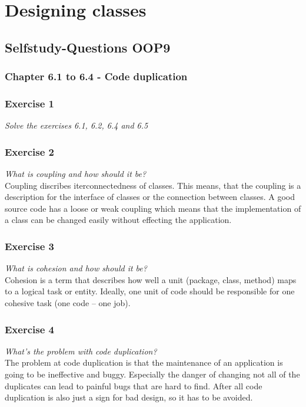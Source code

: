 \section{Designing classes}


\subsection{Selfstudy-Questions OOP9}

\subsubsection{Chapter 6.1 to 6.4 - Code duplication}

\subsubsection*{Exercise 1}
\textit{Solve the exercises 6.1, 6.2, 6.4 and 6.5} \\

\subsubsection*{Exercise 2}
\textit{What is coupling and how should it be?} \\
Coupling discribes iterconnectedness of classes. This means, that the 
coupling is a description for the interface of classes or the connection
between classes. A good source code has a loose or weak coupling which means
that the implementation of a class can be changed easily without effecting
the application.

\subsubsection*{Exercise 3}
\textit{What is cohesion and how should it be?} \\
Cohesion is a term that describes how well a unit (package, class, method) 
maps to a logical task or entity. Ideally, one unit of code should be 
responsible for one cohesive task (one code -- one job).

\subsubsection*{Exercise 4}
\textit{What's the problem with code duplication?} \\
The problem at code duplication is that the maintenance of an application is
going to be ineffective and buggy. Especially the danger of changing not all
of the duplicates can lead to painful bugs that are hard to find. After all
code duplication is also just a sign for bad design, so it has to be avoided.

